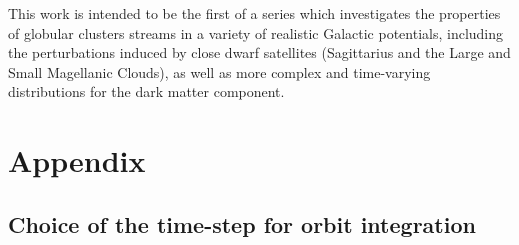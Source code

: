     This work is intended to be the first of a series which investigates the properties of globular clusters streams in a variety of realistic Galactic potentials, including the perturbations induced by close dwarf satellites (Sagittarius and the Large and Small Magellanic Clouds), as well as more complex and time-varying distributions for the dark matter component. 


\section{Appendix}
    \subsection{Choice of the time-step for orbit integration}\label{deltat}

